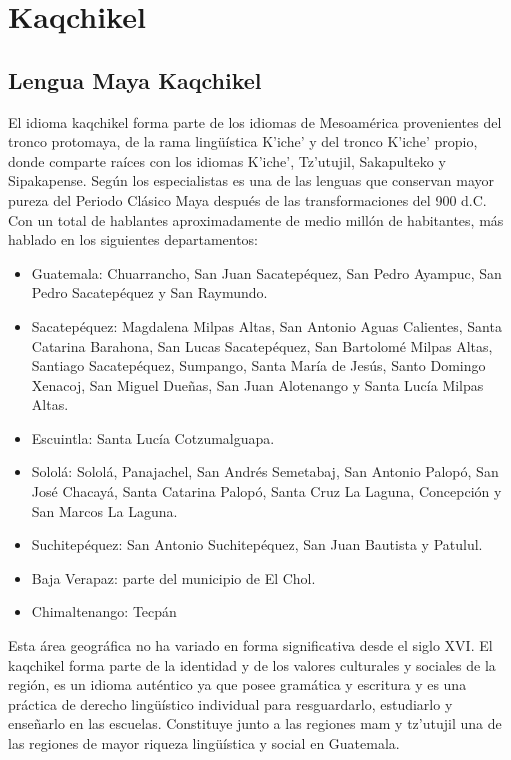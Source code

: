 \documentclass[a4paper,openright,11pt]{article}
\begin{document}
\section{Kaqchikel}
\subsection{Lengua Maya Kaqchikel}
El idioma kaqchikel forma parte de los idiomas de Mesoamérica provenientes del tronco protomaya, de la rama lingüística K’iche’ y del tronco K’iche’ propio, donde comparte raíces con los idiomas K’iche’, Tz’utujil, Sakapulteko y Sipakapense. Según los especialistas es una de las lenguas que conservan mayor pureza del Periodo Clásico Maya después de las transformaciones del 900 d.C. Con un total de hablantes aproximadamente de medio millón de habitantes, más hablado en los siguientes departamentos:
\begin{itemize}
	\item Guatemala: Chuarrancho, San Juan Sacatepéquez, San Pedro Ayampuc, San Pedro Sacatepéquez y San Raymundo.
	\item Sacatepéquez: Magdalena Milpas Altas, San Antonio Aguas Calientes, Santa Catarina Barahona, San Lucas Sacatepéquez, San Bartolomé Milpas Altas, Santiago Sacatepéquez, Sumpango, Santa María de Jesús, Santo Domingo Xenacoj, San Miguel Dueñas, San Juan Alotenango y Santa Lucía Milpas Altas.
	\item Escuintla: Santa Lucía Cotzumalguapa.
	\item Sololá: Sololá, Panajachel, San Andrés Semetabaj, San Antonio Palopó, San José Chacayá, Santa Catarina Palopó, Santa Cruz La Laguna, Concepción y San Marcos La Laguna.
	\item Suchitepéquez: San Antonio Suchitepéquez, San Juan Bautista y Patulul.
	\item Baja Verapaz: parte del municipio de El Chol.
	\item Chimaltenango: Tecpán
\end{itemize}
Esta área geográfica no ha variado en forma significativa desde el siglo XVI. El kaqchikel  forma parte de la identidad y de los valores culturales y sociales de la región, es un idioma auténtico ya que posee gramática y escritura y es una práctica de derecho lingüístico individual para resguardarlo, estudiarlo y enseñarlo en las escuelas. Constituye junto a las regiones mam y tz’utujil una de las regiones de mayor riqueza lingüística y social en Guatemala. \\
\end{document}

